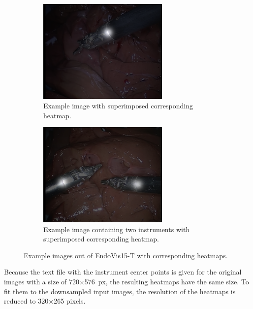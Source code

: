 \begin{figure}
\centering
\begin{subfigure}[t]{0.49\textwidth}
	\centering
	\includegraphics[width=0.7\textwidth]{images/dataset/robotic15_segm/img+heatmap_1instrument.png}
	\caption{Example image with superimposed corresponding heatmap.}
	\label{img:instr+heatmap}
\end{subfigure}	
\begin{subfigure}[t]{0.49\textwidth}
	\centering
	\includegraphics[width=0.7\textwidth]{images/dataset/robotic15_segm/image_frame001_superimposed_heatmap.png}
	\caption{Example image containing two instruments with superimposed corresponding heatmap.}
	\label{img:2instr+heatmap}
\end{subfigure}
\caption[Example image EndoVis15-T, corresponding heatmap]{Example images out of EndoVis15-T with corresponding heatmaps.}
\label{img:superimposed_heatmaps}
\end{figure}

Because the text file with the instrument center points is given for the original images with a size of 720$\times$576~px, the resulting heatmaps have the same size.
To fit them to the downsampled input images, the resolution of the heatmaps is reduced to 320$\times$265 pixels.

